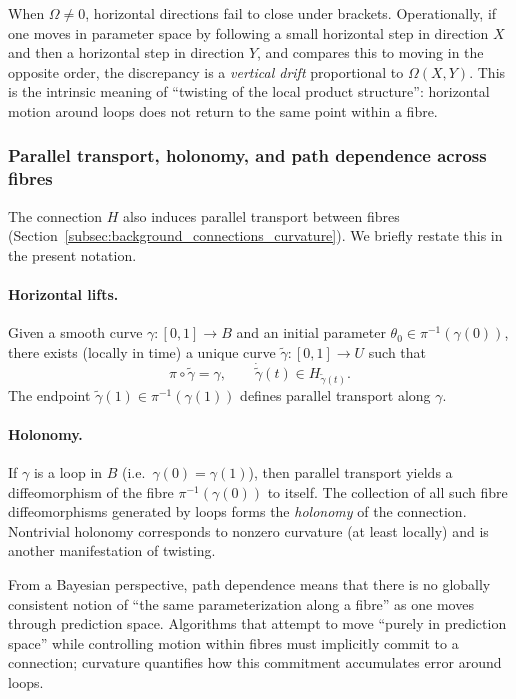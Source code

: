 When $\Omega\neq 0$, horizontal directions fail to close under brackets.
Operationally, if one moves in parameter space by following a small horizontal step in direction $X$
and then a horizontal step in direction $Y$, and compares this to moving in the opposite order,
the discrepancy is a \emph{vertical drift} proportional to $\Omega(X,Y)$.
This is the intrinsic meaning of ``twisting of the local product structure'':
horizontal motion around loops does not return to the same point within a fibre.

\subsubsection{Parallel transport, holonomy, and path dependence across fibres}

The connection $H$ also induces parallel transport between fibres (Section~\ref{subsec:background_connections_curvature}).
We briefly restate this in the present notation.

\paragraph{Horizontal lifts.}
Given a smooth curve $\gamma:[0,1]\to B$ and an initial parameter $\theta_0\in\pi^{-1}(\gamma(0))$,
there exists (locally in time) a unique curve $\widetilde\gamma:[0,1]\to U$ such that
\[
\pi\circ \widetilde\gamma = \gamma,
\qquad
\dot{\widetilde\gamma}(t)\in H_{\widetilde\gamma(t)}.
\]
The endpoint $\widetilde\gamma(1)\in\pi^{-1}(\gamma(1))$ defines parallel transport along $\gamma$.

\paragraph{Holonomy.}
If $\gamma$ is a loop in $B$ (i.e.\ $\gamma(0)=\gamma(1)$), then parallel transport yields a
diffeomorphism of the fibre $\pi^{-1}(\gamma(0))$ to itself.
The collection of all such fibre diffeomorphisms generated by loops forms the
\emph{holonomy} of the connection.
Nontrivial holonomy corresponds to nonzero curvature (at least locally) and is another
manifestation of twisting.

From a Bayesian perspective, path dependence means that there is no globally consistent notion of
``the same parameterization along a fibre'' as one moves through prediction space.
Algorithms that attempt to move ``purely in prediction space'' while controlling motion within fibres
must implicitly commit to a connection; curvature quantifies how this commitment accumulates error
around loops.

